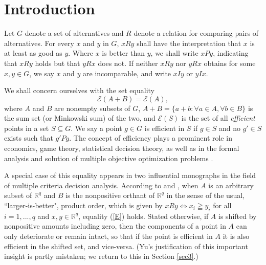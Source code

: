 \documentclass[pdflatex,sn-apa,11pt]{sn-jnl}%
\begin{document}
\section{Introduction}\label{sec1}

Let $G$ denote a set of alternatives and $R$ denote a relation for comparing pairs of alternatives. For every $x$ and $y$ in $G$, $xRy$ shall have the interpretation that $x$ is at least as good as $y$. Where $x$ is better than $y$, we shall write $xPy$, indicating that $xRy$ holds but that $yRx$ does not. If neither $xRy$ nor $yRx$ obtains for some $x, y \in G$, we say $x$ and $y$ are incomparable, and write $xIy$ or $yIx$. 

We shall concern ourselves with the set equality
\begin{equation}\tag{E}\label{E}\mathscr{E}(A + B) = \mathscr{E}(A),\end{equation}
where $A$ and $B$ are nonempty subsets of $G$, $A + B = \{a + b: \forall a \in A, \forall b \in B\}$ is the sum set (or Minkowski sum) of the two, and $\mathscr{E}(S)$ is the set of all \textit{efficient} points in a set $S \subseteq G$. We say a point $g \in G$ is efficient in $S$ if $g \in S$ and no $g' \in S$ exists such that $g'Pg$. The concept of efficiency plays a prominent role in economics, game theory, statistical decision theory, as well as in the formal analysis and solution of multiple objective optimization problems \citep{GEOFFRION1968618, benson1978existence, ganjali2024multi, mifrani2025linear}.

A special case of this equality appears in two influential monographs in the field of multiple criteria decision analysis. According to \cite{yu1985multiple} and \cite{ehrgott2005multicriteria}, when $A$ is an arbitrary subset of $\mathbb{R}^{q}$ and $B$ is the nonpositive orthant of $\mathbb{R}^{q}$ in the sense of the usual, ``larger-is-better", product order, which is given by $xRy \iff x_i \geqq y_i$ for all $i = 1, ..., q$ and $x, y \in \mathbb{R}^{q}$, equality (\ref{E}) holds. Stated otherwise, if $A$ is shifted by nonpositive amounts including zero, then the components of a point in $A$ can only deteriorate or remain intact, so that if the point is efficient in $A$ it is also efficient in the shifted set, and vice-versa. (Yu's justification of this important insight is partly mistaken; we return to this in Section \ref{sec3}.) %
\end{document}
